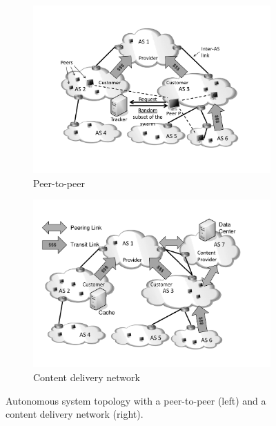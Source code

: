 \begin{figure}[bt]
	\centering
\vspace{-0.2cm}
\hspace{-0.5cm}
	\begin{subfigure}[b]{0.54\textwidth}
	  \includegraphics[width=\textwidth]{aslevel/figs/p2p}
    \vspace{-0.5cm}
    \caption{Peer-to-peer}
    \label{fig:aslevel:cdn}
  \end{subfigure}
\hspace{-0.5cm}
	\begin{subfigure}[b]{0.54\textwidth}
	 	\includegraphics[width=\textwidth]{aslevel/figs/cdn}
    \vspace{-0.5cm}
    \caption{Content delivery network}
    \label{fig:aslevel:cdn}
	\end{subfigure}
\hspace{-0.5cm}
	\caption{Autonomous system topology with a peer-to-peer (left) and a content delivery network (right).}
\end{figure}

